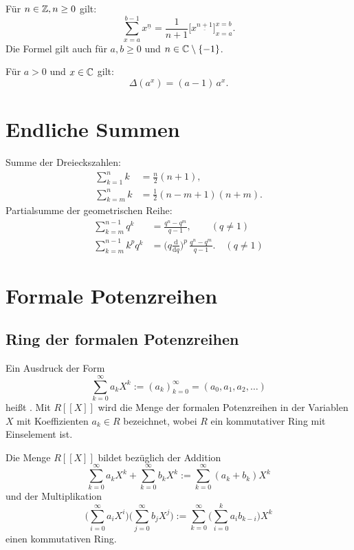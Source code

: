 Für $n\in\mathbb Z,n\ge 0$ gilt:
\begin{equation}
\sum_{x=a}^{b-1} x^{\underline n} = \frac{1}{n+1}\big[x^{\underline{n+1}}\big]_{x=a}^{x=b}.
\end{equation}
Die Formel gilt auch für $a,b\ge 0$ und $n\in\mathbb C\setminus\{-1\}$.

Für $a>0$ und $x\in\mathbb C$ gilt:
\begin{equation}
\Delta(a^x) = (a-1)\,a^x.
\end{equation}

\section{Endliche Summen}
Summe der Dreieckszahlen:
\begin{align}
\sum_{k=1}^n k &= \frac{n}{2}(n+1),\\
\sum_{k=m}^n k &= \frac{1}{2}(n-m+1)(n+m).
\end{align}
Partialsumme der geometrischen Reihe:
\begin{align}
\sum_{k=m}^{n-1} q^k &= \frac{q^n-q^m}{q-1},\qquad (q\ne 1)\\
\sum_{k=m}^{n-1} k^p q^k
&= \Big(q\frac{\mathrm d}{\mathrm dq}\Big)^p\,\frac{q^n-q^m}{q-1}.\quad (q\ne 1)
\end{align}

\section{Formale Potenzreihen}
\subsection{Ring der formalen Potenzreihen}
\begin{definition}
Ein Ausdruck der Form
\begin{equation}
\sum_{k=0}^\infty a_k X^k := (a_k)_{k=0}^\infty = (a_0,a_1,a_2,\ldots)
\end{equation}
heißt . Mit $R[[X]]$ wird die Menge
der formalen Potenzreihen in der Variablen $X$ mit Koeffizienten
$a_k\in R$ bezeichnet, wobei $R$ ein kommutativer Ring
mit Einselement ist.
\end{definition}
Die Menge $R[[X]]$ bildet bezüglich der Addition
\begin{equation}
\sum_{k=0}^\infty a_k X^k+\sum_{k=0}^\infty b_k X^k
:= \sum_{k=0}^\infty (a_k+b_k)X^k
\end{equation}
und der Multiplikation
\begin{equation}
\bigg(\sum_{i=0}^\infty a_i X^i\bigg)\bigg(\sum_{j=0}^\infty b_j X^j\bigg)
:= \sum_{k=0}^\infty \bigg(\sum_{i=0}^{k} a_ib_{k-i}\bigg)X^k
\end{equation}
einen kommutativen Ring.

